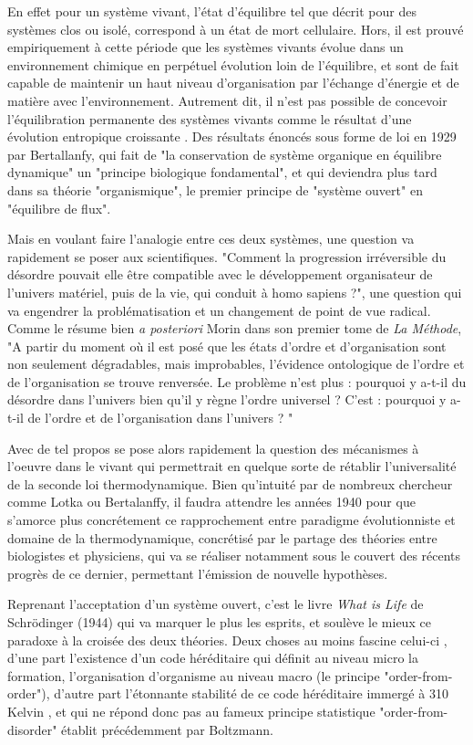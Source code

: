 {En effet pour un système vivant, l'état d'équilibre tel que décrit pour des systèmes clos ou isolé, correspond à un état de mort cellulaire. Hors, il est prouvé empiriquement à cette période que les systèmes vivants évolue dans un environnement chimique en perpétuel évolution loin de l'équilibre, et sont de fait capable de maintenir un haut niveau d'organisation par l'échange d'énergie et de matière avec l'environnement. Autrement dit, il n'est pas possible de concevoir l'équilibration permanente des systèmes vivants comme le résultat d'une évolution entropique croissante \autocite[248]{Lemoigne1977}. Des résultats énoncés sous forme de loi en 1929 par Bertallanfy, qui fait de "la conservation de système organique en équilibre dynamique" un "principe biologique fondamental", et qui deviendra plus tard dans sa théorie "organismique", le premier principe de  "système ouvert" en "équilibre de flux". \autocite[492]{Pouvreau2013} 

Mais en voulant faire l'analogie entre ces deux systèmes, une question va rapidement se poser aux scientifiques. "Comment la progression irréversible du désordre pouvait elle être compatible avec le développement organisateur de l'univers matériel, puis de la vie, qui conduit à homo sapiens ?", une question qui va engendrer la problématisation et un changement de point de vue radical. Comme le résume bien \textit{a posteriori} Morin dans son premier tome de \textit{La Méthode}, "A partir du moment où il est posé que les états d'ordre et d'organisation sont non seulement dégradables, mais improbables, l'évidence ontologique de l'ordre et de l'organisation se trouve renversée. Le problème n'est plus : pourquoi y a-t-il du désordre dans l'univers bien qu'il y règne l'ordre universel ? C'est : pourquoi y a-t-il de l'ordre et de l'organisation dans l'univers ? " \autocite[37]{Morin1977}

Avec de tel propos se pose alors rapidement la question des mécanismes à l'oeuvre dans le vivant qui permettrait en quelque sorte de rétablir l'universalité de la seconde loi thermodynamique. Bien qu'intuité par de nombreux chercheur comme Lotka ou Bertalanffy, il faudra attendre les années 1940 pour que s'amorce plus concrétement ce rapprochement entre paradigme évolutionniste et domaine de la thermodynamique, concrétisé par le partage des théories entre biologistes et physiciens, qui va se réaliser notamment sous le couvert des récents progrès de ce dernier, permettant l'émission de nouvelle hypothèses. 

Reprenant l'acceptation d'un système ouvert, c'est le livre \textit{What is Life} de Schrödinger (1944) qui va marquer le plus les esprits, et soulève le mieux ce paradoxe à la croisée des deux théories. Deux choses au moins fascine celui-ci \autocite{Foerster1959}, d'une part l'existence d'un code héréditaire qui définit au niveau micro la formation, l'organisation d'organisme au niveau macro (le principe "order-from-order"), d'autre part l'étonnante stabilité de ce code héréditaire immergé à 310 Kelvin \autocite[47]{Schrodinger1944}, et qui ne répond donc pas au fameux principe statistique "order-from-disorder" établit précédemment par Boltzmann.

}
